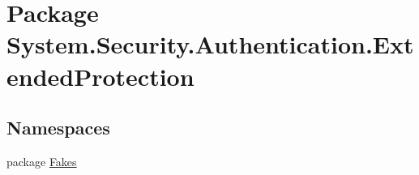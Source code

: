 \hypertarget{namespace_system_1_1_security_1_1_authentication_1_1_extended_protection}{\section{Package System.\-Security.\-Authentication.\-Extended\-Protection}
\label{namespace_system_1_1_security_1_1_authentication_1_1_extended_protection}
}
\subsection*{Namespaces}
\begin{DoxyCompactItemize}
\item 
package \hyperlink{namespace_system_1_1_security_1_1_authentication_1_1_extended_protection_1_1_fakes}{Fakes}
\end{DoxyCompactItemize}
